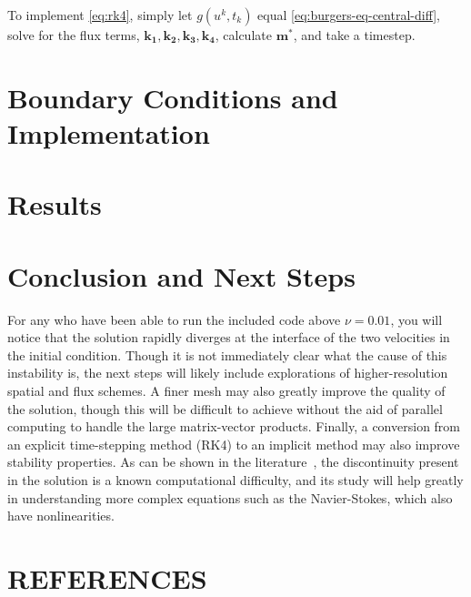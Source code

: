 \documentclass[ltr]{ornltm} %
\numberwithin{equation}{section}
\begin{document}
	To implement \cref{eq:rk4}, simply let $g(u^k,t_k)$ equal \cref{eq:burgers-eq-central-diff}, solve for the flux terms, $\mathbf{k_1},\mathbf{k_2},\mathbf{k_3},\mathbf{k_4}$, calculate $\mathbf{m^*}$, and take a timestep.


	\section{Boundary Conditions and Implementation}\label{sec:boundary-conditions-and-implementation}
	


	\section{Results}\label{sec:results}
	
	\clearpage


	\section{Conclusion and Next Steps}\label{sec:conclusion}
	For any who have been able to run the included code above $\nu=0.01$, you will notice that the solution rapidly diverges at the interface of the two velocities in the initial condition.
	Though it is not immediately clear what the cause of this instability is, the next steps will likely include explorations of higher-resolution spatial and flux schemes.
	A finer mesh may also greatly improve the quality of the solution, though this will be difficult to achieve without the aid of parallel computing to handle the large matrix-vector products.
	Finally, a conversion from an explicit time-stepping method (RK4) to an implicit method may also improve stability properties.
	As can be shown in the literature~\autocite{cameronNOTESBURGERSEQUATION,salihBurgersEquation2016}, the discontinuity present in the solution is a known computational difficulty, and its study will help greatly in understanding more complex equations such as the Navier-Stokes, which also have nonlinearities.





	\section{REFERENCES}%
	\printbibliography[heading=none]%
\end{document}
